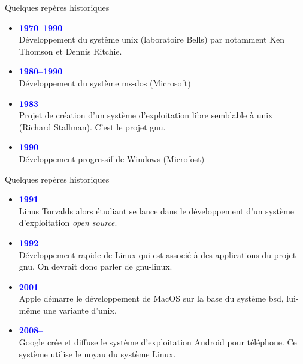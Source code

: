 \documentclass[10pt]{beamer}
\begin{document}
\begin{frame}
	\mframe{\Systeme}
	\begin{block}{Quelques repères historiques}
		\begin{itemize}
			\item<1->  \textcolor{blue}{\textbf{1970--1990}} \\
			      Développement du système {\sc unix} (laboratoire Bells) par notamment Ken Thomson et Dennis Ritchie.
			\item<2->  \textcolor{blue}{\textbf{1980--1990}} \\
			      Développement du système {\sc ms-dos} (Microsoft)
			\item<3->  \textcolor{blue}{\textbf{1983}} \\
			      Projet de création d'un système d'exploitation libre semblable à {\sc unix} (Richard Stallman). C'est le projet {\sc gnu}.
			\item<4->  \textcolor{blue}{\textbf{1990--}} \\
			      Développement progressif de Windows (Microfost)
		\end{itemize}
	\end{block}
\end{frame}

\begin{frame}
	\mframe{\Systeme}
	\begin{block}{Quelques repères historiques}
		\begin{itemize}
			\item<1-> \textcolor{blue}{\textbf{1991}} \\
			      Linus Torvalds alors étudiant se lance dans le développement d'un système d'exploitation \textit{open source}. \\
			\item<3->  \textcolor{blue}{\textbf{1992--}} \\
			      Développement rapide de Linux qui est associé à des applications du projet {\sc gnu}. On devrait donc parler de {\sc gnu-l}inux.
			\item<4-> \textcolor{blue}{\textbf{2001--}} \\
			      Apple démarre le développement de MacOS sur la base du système {\sc bsd}, lui-même une variante d'{\sc unix}.
			\item<5-> \textcolor{blue}{\textbf{2008--}} \\
			      Google crée et diffuse le système d'exploitation Android pour téléphone. Ce système utilise le noyau du système Linux.
		\end{itemize}
	\end{block}
\end{frame}
\end{document}

